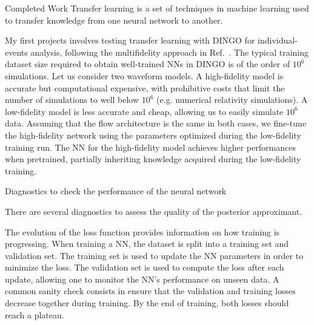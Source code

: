 \documentclass[a4paper, 12pt, twoside, openright, titlepage]{book}
\begin{document}
\begin{chapter}{Completed Work}
Transfer learning is a set of techniques in machine learning used to transfer knowledge from one neural network to another.

My first projects involves testing transfer learning with DINGO for individual-events analysis, following the multifidelity approach in Ref.~\cite{2025arXiv250208416K}.
The typical training dataset size required to obtain well-trained NNs in DINGO is of the order of $10^{6}$ simulations.
Let us consider two waveform models.
A high-fidelity model is accurate but computational expensive, with prohibitive costs that limit the number of simulations to well below $10^{6}$ (e.g. numerical relativity simulations).
A low-fidelity model is less accurate and cheap, allowing us to easily simulate $10^{6}$ data.
Assuming that the flow architecture is the same in both cases, we fine-tune the high-fidelity network using the parameters optimized during the low-fidelity training run.
The NN for the high-fidelity model achieves higher performances when pretrained, partially inheriting knowledge acquired during the low-fidelity training.




\begin{section}{Diagnostics to check the performance of the neural network}

There are several diagnostics to assess the quality of the posterior approximant.

The evolution of the loss function provides information on how training is progressing.
When training a NN, the dataset is split into a training set and validation set. 
The training set is used to update the NN parameters in order to minimize the loss.
The validation set is used to compute the loss after each update, allowing one to monitor the NN's performance on unseen data.
A common sanity check consists in ensure that the validation and training losses decrease together during training.
By the end of training, both losses should reach a plateau.


\end{section}
\end{chapter}
\end{document}
